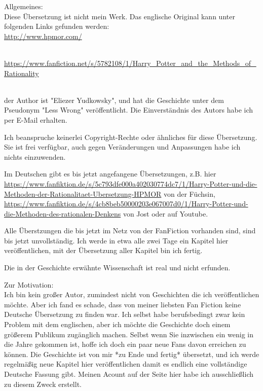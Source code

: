 

\hypertarget{einfuxfchrung}{%

Allgemeines:\\ Diese Übersetzung ist nicht mein Werk. Das englische Original kann unter folgenden Links gefunden werden:\\ \url{http://www.hpmor.com/}\strut \\ \url{https://www.fanfiction.net/s/5782108/1/Harry_Potter_and_the_Methods_of_Rationality}\strut \\ der Author ist "Eliezer Yudkowsky", und hat die Geschichte unter dem Pseudonym "Less Wrong" veröffentlicht. Die Einverständnis des Autors habe ich per E-Mail erhalten.

Ich beanspruche keinerlei Copyright-Rechte oder ähnliches für diese Übersetzung. Sie ist frei verfügbar, auch gegen Veränderungen und Anpassungen habe ich nichts einzuwenden.

Im Deutschen gibt es bis jetzt angefangene Übersetzungen, z.B. hier\\ \url{https://www.fanfiktion.de/s/5c793dfe000a402030774dc7/1/Harry-Potter-und-die-Methoden-der-Rationalitaet-Ubersetzung-HPMOR} von der Füchsin,\\ \url{https://www.fanfiktion.de/s/4cb8beb50000203e067007d0/1/Harry-Potter-und-die-Methoden-des-rationalen-Denkens} von Jost oder auf Youtube.

Alle Überstzungen die bis jetzt im Netz von der FanFiction vorhanden sind, sind bis jetzt unvollständig. Ich werde in etwa alle zwei Tage ein Kapitel hier veröffentlichen, mit der Übersetzung aller Kapitel bin ich fertig.

Die in der Geschichte erwähnte Wissenschaft ist real und nicht erfunden.

Zur Motivation:\\ Ich bin kein großer Autor, zumindest nicht von Geschichten die ich veröffentlichen möchte. Aber ich fand es schade, dass von meiner liebsten Fan Fiction keine Deutsche Übersetzung zu finden war. Ich selbst habe berufsbedingt zwar kein Problem mit dem englischen, aber ich möchte die Geschichte doch einem größerem Publikum zugänglich machen. Selbst wenn Sie inzwischen ein wenig in die Jahre gekommen ist, hoffe ich doch ein paar neue Fans davon erreichen zu können. Die Geschichte ist von mir *zu Ende und fertig* übersetzt, und ich werde regelmäßig neue Kapitel hier veröffentlichen damit es endlich eine vollständige Deutsche Fassung gibt. Meinen Acount auf der Seite hier habe ich ausschließlich zu diesem Zweck erstellt.

}
